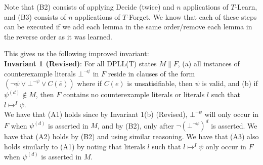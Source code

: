 \documentclass{llncs}
\begin{document}
Note that (B2) consists of applying Decide (twice) and $n$ applications of $T$-Learn, and (B3) consists of $n$ applications of $T$-Forget.
We know that each of these steps can be executed if we add each lemma in the same order/remove each lemma in the reverse order as it was learned.

This gives us the following improved invariant: \\

{\bf Invariant 1 (Revised)}:
For all DPLL(T) states $M \parallel F$,
(a) all instances of counterexample literals $\bot^{\neg \psi}$ in $F$ reside in clauses of the form $( \neg \psi \vee \bot^{\neg \psi} \vee C(\bar{e}) )$ where if $C(e)$ is unsatisifiable, then $\psi$ is valid, and
(b) if $\psi^{(d)} \not\in M$, then $F$ contains no counterexample literals or literals $l$ such that $l \mapsto^I \psi$. \\

We have that (A1) holds since by Invariant 1(b) (Revised), $\bot^{\neg \psi}$ will only occur in $F$ when $\psi^{(d)}$ is asserted in $M$, and by (B2), only after $\neg (\bot^{\neg \psi})^d$ is asserted.
We have that (A2) holds by (B2) and using similar reasoning.
We have that (A3) also holds similarly to (A1) by noting that literals $l$ such that $l \mapsto^I \psi$ only occur in $F$ when $\psi^{(d)}$ is asserted in $M$.
\end{document}
